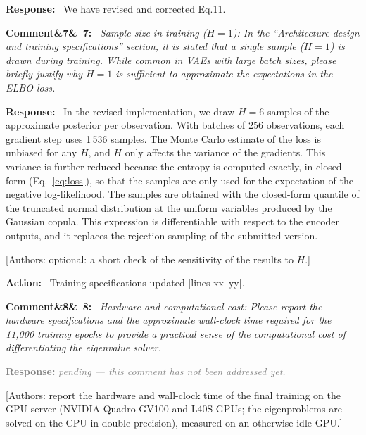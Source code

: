 \documentclass[11pt]{article}
\newenvironment{rcomment}[1]{\par\bigskip\noindent\textbf{Comment\ifx&#1&\else\ #1\fi:}\ \itshape}{\par}
\newenvironment{response}{\par\smallskip\noindent\color{resp}\textbf{Response:}\ }{\par}
\newenvironment{action}{\par\smallskip\noindent\color{resp}\textbf{Action:}\ }{\par}
\newcommand{\pending}{\par\smallskip\noindent\textcolor{gray}{\textbf{Response:} \textit{pending --- this comment
has not been addressed yet.}}\par}
\newcommand{\authornote}[1]{\textcolor{note}{\textsf{[Authors: #1]}}}
\newcommand{\tbd}[1]{\textcolor{note}{\textsf{[#1]}}}
\newcommand{\lines}[1]{\tbd{lines #1}}
\begin{document}
\begin{response}
We have revised and corrected Eq.11. 
\end{response}
\begin{rcomment}{7}
Sample size in training ($H=1$): In the ``Architecture design and training specifications'' section, it is stated that
a single sample ($H=1$) is drawn during training. While common in VAEs with large batch sizes, please briefly justify why
$H=1$ is sufficient to approximate the expectations in the ELBO loss.
\end{rcomment}

\begin{response}
In the revised implementation, we draw $H=6$ samples of the approximate posterior per observation. With batches of 256
observations, each gradient step uses 1\,536 samples. The Monte Carlo estimate of the loss is unbiased for any $H$, and
$H$ only affects the variance of the gradients. This variance is further reduced because the entropy is computed
exactly, in closed form (Eq.~\eqref{eq:loss}), so that the samples are only used for the expectation of the negative
log-likelihood. The samples are obtained with the closed-form quantile of the truncated normal distribution at the uniform
variables produced by the Gaussian copula. This expression is differentiable with respect to the encoder outputs, and it
replaces the rejection sampling of the submitted version.
\end{response}
\authornote{optional: a short check of the sensitivity of the results to $H$.}

\begin{action}
Training specifications updated \lines{xx--yy}.
\end{action}

\begin{rcomment}{8}
Hardware and computational cost: Please report the hardware specifications and the approximate wall-clock time
required for the 11,000 training epochs to provide a practical sense of the computational cost of differentiating the
eigenvalue solver.
\end{rcomment}
\pending
\authornote{report the hardware and wall-clock time of the final training on the GPU server (NVIDIA Quadro GV100 and L40S GPUs; the eigenproblems are solved on the CPU in double precision), measured on an otherwise idle GPU.}
\end{document}
